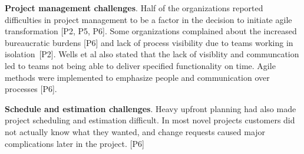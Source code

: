 {\bfseries Project management challenges}. Half of the organizations reported
difficulties in project management to be a factor in the decision to initiate
agile transformation [P2, P5, P6]. Some organizations complained about the
increased bureaucratic burdens [P6] and lack of process visibility due to teams
working in isolation [P2]. Wells et al also stated that the lack of visiblity
and communcation led to teams not being able to deliver specified functionality
on time. Agile methods were implemented to emphasize people and communication
over processes [P6].

{\bfseries Schedule and estimation challenges}. Heavy upfront planning had also
made project scheduling and estimation difficult. In most novel projects
customers did not actually know what they wanted, and change requests caused
major complications later in the project. [P6]
